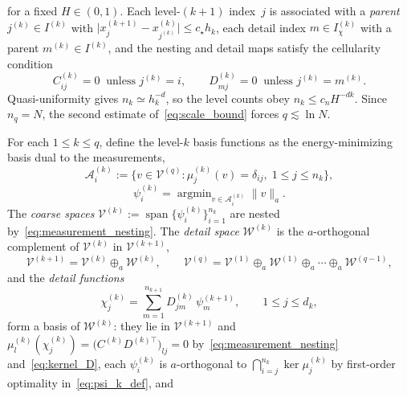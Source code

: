 \documentclass[hidelinks]{siamart}
\theoremstyle{nonumberplain}
\numberwithin{theorem}{section}
\begin{document}
for a fixed $H \in (0,1)$. Each
level-$(k{+}1)$ index~$j$ is associated with a \emph{parent} $j^{(k)} \in I^{(k)}$
with $\lvert x^{(k+1)}_j - x^{(k)}_{j^{(k)}} \rvert \leq c_\star h_k$, each
detail index $m \in I^{(k)}_\chi$ with a parent $m^{(k)} \in I^{(k)}$, and
the nesting and detail maps satisfy the cellularity condition
\begin{equation}\label{eq:cellularity}
  C^{(k)}_{ij} = 0 \ \text{ unless } j^{(k)} = i,
  \qquad
  D^{(k)}_{mj} = 0 \ \text{ unless } j^{(k)} = m^{(k)} .
\end{equation}
Quasi-uniformity gives $n_k \simeq h_k^{-d}$, so the level counts obey
$n_k \leq c_n H^{-dk}$.  Since $n_q = N$, the second
estimate of~\eqref{eq:scale_bound} forces $q \lesssim\ln N$.

For each $1 \leq k \leq q$, define the level-$k$ basis functions as the energy-minimizing basis dual to the measurements,
\begin{equation}\label{eq:constraint_set}
  \mathcal{A}^{(k)}_i
  := \{v \in \mathcal{V}^{(q)} : \mu^{(k)}_j(v) = \delta_{ij},\;
       1 \leq j \leq n_k\},
\end{equation}
\begin{equation}\label{eq:psi_k_def}
    \psi^{(k)}_i = \operatorname{argmin}_{v \in \mathcal{A}^{(k)}_i} \lVert v\rVert_a .
\end{equation}
The \emph{coarse spaces}
$\mathcal{V}^{(k)} := \operatorname{span}\{\psi^{(k)}_i\}_{i=1}^{n_k}$
are nested by~\eqref{eq:measurement_nesting}. The \emph{detail space}
$\mathcal{W}^{(k)}$ is the $a$-orthogonal complement of
$\mathcal{V}^{(k)}$ in $\mathcal{V}^{(k+1)}$,
\begin{equation}\label{eq:scale_decomposition}
  \mathcal{V}^{(k+1)} = \mathcal{V}^{(k)} \oplus_a \mathcal{W}^{(k)},
  \qquad
  \mathcal{V}^{(q)} = \mathcal{V}^{(1)} \oplus_a \mathcal{W}^{(1)}
  \oplus_a \cdots \oplus_a \mathcal{W}^{(q-1)} ,
\end{equation}
and the \emph{detail functions}
\begin{equation}\label{eq:detail_basis}
  \chi^{(k)}_j = \sum_{m=1}^{n_{k+1}} D^{(k)}_{jm}\,\psi^{(k+1)}_m,
  \qquad 1 \leq j \leq d_k ,
\end{equation}
form a basis of $\mathcal{W}^{(k)}$: they lie in $\mathcal{V}^{(k+1)}$ and
$\mu^{(k)}_l(\chi^{(k)}_j) = \bigl(C^{(k)} D^{(k)\top}\bigr)_{lj} = 0$
by~\eqref{eq:measurement_nesting} and~\eqref{eq:kernel_D}, each
$\psi^{(k)}_i$ is $a$-orthogonal to $\bigcap_{i=j}^{n_k}\ker \mu^{(k)}_j$ by
first-order optimality in~\eqref{eq:psi_k_def}, and
\end{document}
